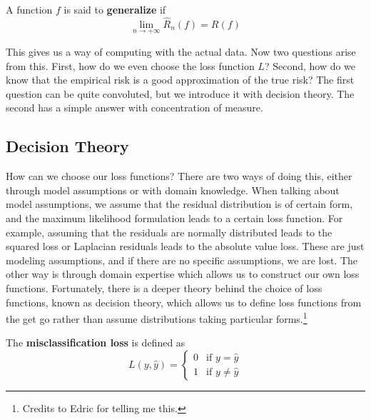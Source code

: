 \documentclass{article}
\begin{document}
    \begin{definition}[Generlize]
      A function $f$ is said to \textbf{generalize} if 
      \begin{equation}
        \lim_{n \rightarrow +\infty} \hat{R}_n (f) = R(f)
      \end{equation}
    \end{definition}

    This gives us a way of computing with the actual data. Now two questions arise from this. First, how do we even choose the loss function $L$? Second, how do we know that the empirical risk is a good approximation of the true risk? The first question can be quite convoluted, but we introduce it with decision theory. The second has a simple answer with concentration of measure.  

  \subsection{Decision Theory}

    How can we choose our loss functions? There are two ways of doing this, either through model assumptions or with domain knowledge. When talking about model assumptions, we assume that the residual distribution is of certain form, and the maximum likelihood formulation leads to a certain loss function. For example, assuming that the residuals are normally distributed leads to the squared loss or Laplacian residuals leads to the absolute value loss. These are just modeling assumptions, and if there are no specific assumptions, we are lost. The other way is through domain expertise which allows us to construct our own loss functions. Fortunately, there is a deeper theory behind the choice of loss functions, known as decision theory, which allows us to define loss functions from the get go rather than assume distributions taking particular forms.\footnote{Credits to Edric for telling me this.}

    \begin{definition}
      The \textbf{misclassification loss} is defined as 
      \begin{equation}
        L(y, \hat{y}) = \begin{cases} 0 & \text{if } y = \hat{y} \\ 1 & \text{if } y \neq \hat{y} \end{cases}
      \end{equation}
    \end{definition}
\end{document}
